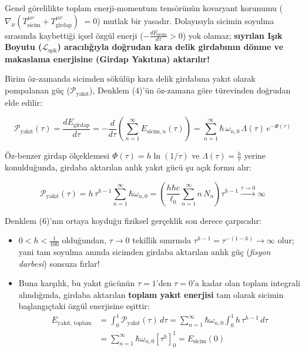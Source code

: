 \documentclass[12pt,a4paper]{article}
\begin{document}
Genel görelilikte toplam enerji-momentum tensörünün kovaryant korunumu ($\nabla_\mu ( T^{\mu\nu}_{\text{sicim}} + T^{\mu\nu}_{\text{girdap}} )$ $= 0$) mutlak bir yasadır. Dolayısıyla sicimin soyulma sırasında kaybettiği içsel özgül enerji ($-\frac{d E_{\text{sicim}}}{d\tau} > 0$) yok olamaz; \textbf{sıyrılan Işık Boyutu ($\mathcal{L}_{\text{ışık}}$) aracılığıyla doğrudan kara delik girdabının dönme ve makaslama enerjisine (Girdap Yakıtına) aktarılır!}

Birim öz-zamanda sicimden sökülüp kara delik girdabına yakıt olarak pompalanan güç ($\mathcal{P}_{\text{yakıt}}$), Denklem (4)'ün öz-zamana göre türevinden doğrudan elde edilir:

\begin{equation}
\mathcal{P}_{\text{yakıt}}(\tau) = \frac{d E_{\text{girdap}}}{d\tau} = -\frac{d}{d\tau} \left( \sum_{n=1}^{\infty} E_{\text{sicim}, n}(\tau) \right) = \sum_{n=1}^{\infty} \hbar \, \omega_{n,0} \, \Lambda(\tau) \, e^{-\Phi(\tau)}
\end{equation}

Öz-benzer girdap ölçeklemesi $\Phi(\tau) = h \ln(1/\tau)$ ve $\Lambda(\tau) = \frac{h}{\tau}$ yerine konulduğunda, girdaba aktarılan anlık yakıt gücü şu açık formu alır:

\begin{equation}
\mathcal{P}_{\text{yakıt}}(\tau) = h \, \tau^{h - 1} \sum_{n=1}^{\infty} \hbar \omega_{n,0} = \left( \frac{h \hbar c}{\ell_0} \sum_{n=1}^{\infty} n \, N_n \right) \tau^{h - 1} \xrightarrow{\tau \to 0} \infty
\end{equation}

Denklem (6)'nın ortaya koyduğu fiziksel gerçeklik son derece çarpıcıdır:
\begin{itemize}
    \item $0 < h < \frac{1}{100}$ olduğundan, $\tau \to 0$ tekillik sınırında $\tau^{h-1} = \tau^{-(1-h)} \to \infty$ olur; yani tam soyulma anında sicimden girdaba aktarılan anlık güç (\textit{fisyon darbesi}) sonsuza fırlar!
    \item Buna karşılık, bu yakıt gücünün $\tau = 1$'den $\tau = 0$'a kadar olan toplam integrali alındığında, girdaba aktarılan \textbf{toplam yakıt enerjisi} tam olarak sicimin başlangıçtaki özgül enerjisine eşittir:
    \begin{equation}
    \begin{aligned}
    E_{\text{yakıt, toplam}} &= \int_0^1 \mathcal{P}_{\text{yakıt}}(\tau) \, d\tau = \sum_{n=1}^{\infty} \hbar \omega_{n,0} \int_0^1 h \, \tau^{h-1} \, d\tau \\
    &= \sum_{n=1}^{\infty} \hbar \omega_{n,0} \left[ \tau^h \right]_0^1 = E_{\text{sicim}}(0)
    \end{aligned}
    \end{equation}
\end{itemize}
\end{document}
